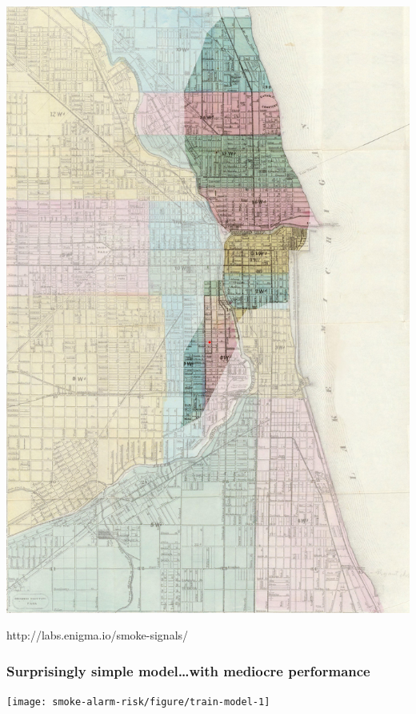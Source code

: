 \documentclass{beamer}
\begin{document}
\begin{frame}
  \begin{center}
    \includegraphics[width=\textwidth,height=0.8\textheight,keepaspectratio=true]{chicago_fire_area}
  \end{center}
\end{frame}

\begin{frame}
  \Large{http://labs.enigma.io/smoke-signals/}
\end{frame}

\begin{frame}
  \frametitle{Surprisingly simple model\dots with mediocre performance}
  \begin{center}
    \texttt{[image: smoke-alarm-risk/figure/train-model-1]}
  \end{center}
\end{frame}
\end{document}
